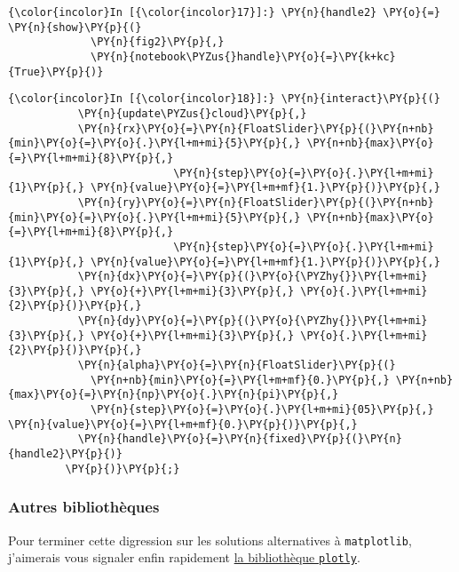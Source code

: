     \begin{Verbatim}[commandchars=\\\{\}]
{\color{incolor}In [{\color{incolor}17}]:} \PY{n}{handle2} \PY{o}{=} \PY{n}{show}\PY{p}{(}
             \PY{n}{fig2}\PY{p}{,}
             \PY{n}{notebook\PYZus{}handle}\PY{o}{=}\PY{k+kc}{True}\PY{p}{)}
\end{Verbatim}


    
    
    
    
    \begin{Verbatim}[commandchars=\\\{\}]
{\color{incolor}In [{\color{incolor}18}]:} \PY{n}{interact}\PY{p}{(}
           \PY{n}{update\PYZus{}cloud}\PY{p}{,}
           \PY{n}{rx}\PY{o}{=}\PY{n}{FloatSlider}\PY{p}{(}\PY{n+nb}{min}\PY{o}{=}\PY{o}{.}\PY{l+m+mi}{5}\PY{p}{,} \PY{n+nb}{max}\PY{o}{=}\PY{l+m+mi}{8}\PY{p}{,}
                          \PY{n}{step}\PY{o}{=}\PY{o}{.}\PY{l+m+mi}{1}\PY{p}{,} \PY{n}{value}\PY{o}{=}\PY{l+m+mf}{1.}\PY{p}{)}\PY{p}{,}
           \PY{n}{ry}\PY{o}{=}\PY{n}{FloatSlider}\PY{p}{(}\PY{n+nb}{min}\PY{o}{=}\PY{o}{.}\PY{l+m+mi}{5}\PY{p}{,} \PY{n+nb}{max}\PY{o}{=}\PY{l+m+mi}{8}\PY{p}{,}
                          \PY{n}{step}\PY{o}{=}\PY{o}{.}\PY{l+m+mi}{1}\PY{p}{,} \PY{n}{value}\PY{o}{=}\PY{l+m+mf}{1.}\PY{p}{)}\PY{p}{,}
           \PY{n}{dx}\PY{o}{=}\PY{p}{(}\PY{o}{\PYZhy{}}\PY{l+m+mi}{3}\PY{p}{,} \PY{o}{+}\PY{l+m+mi}{3}\PY{p}{,} \PY{o}{.}\PY{l+m+mi}{2}\PY{p}{)}\PY{p}{,}
           \PY{n}{dy}\PY{o}{=}\PY{p}{(}\PY{o}{\PYZhy{}}\PY{l+m+mi}{3}\PY{p}{,} \PY{o}{+}\PY{l+m+mi}{3}\PY{p}{,} \PY{o}{.}\PY{l+m+mi}{2}\PY{p}{)}\PY{p}{,}
           \PY{n}{alpha}\PY{o}{=}\PY{n}{FloatSlider}\PY{p}{(}
             \PY{n+nb}{min}\PY{o}{=}\PY{l+m+mf}{0.}\PY{p}{,} \PY{n+nb}{max}\PY{o}{=}\PY{n}{np}\PY{o}{.}\PY{n}{pi}\PY{p}{,}
             \PY{n}{step}\PY{o}{=}\PY{o}{.}\PY{l+m+mi}{05}\PY{p}{,} \PY{n}{value}\PY{o}{=}\PY{l+m+mf}{0.}\PY{p}{)}\PY{p}{,}
           \PY{n}{handle}\PY{o}{=}\PY{n}{fixed}\PY{p}{(}\PY{n}{handle2}\PY{p}{)}
         \PY{p}{)}\PY{p}{;}
\end{Verbatim}


    \hypertarget{autres-bibliothuxe8ques}{%
\subsubsection{Autres bibliothèques}\label{autres-bibliothuxe8ques}}

    Pour terminer cette digression sur les solutions alternatives à
\texttt{matplotlib}, j'aimerais vous signaler enfin rapidement
\href{https://plot.ly/}{la bibliothèque \texttt{plotly}}.

